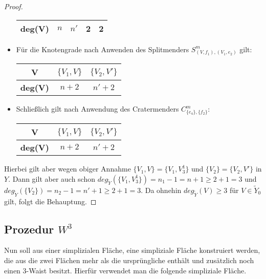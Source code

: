 \documentclass[12pt,titlepage]{article}
\begin{document}
\begin{proof}
\begin{itemize}
\begin{center}
\begin{tabular}{|c|c|c|c|c|}
  \hline
   \textbf{deg(V)} & $n$ & $n'$ & 2 & 2\\  
   \hline
 \end{tabular}
 \end{center}
\item Für die Knotengrade nach Anwenden des Splitmenders $S_{(V,f_1),(V_1,e_2)}^m$ gilt:
\begin{center}
\begin{tabular}{|c|c|c|}
\hline
 \textbf{V} & $\{V_1,V \}$ & $\{V_2,V'\}$ \\ 
  \hline
   \textbf{deg(V)} & $n+2$ & $n'+2$  \\  
   \hline
 \end{tabular}
 \end{center}
\item Schließlich gilt nach Anwendung des Cratermenders $C^m_{\{e_4\},\{f_2\}}$: 
\begin{center}
\begin{tabular}{|c|c|c|}
\hline
 \textbf{V} & $\{V_1,V \}$ & $\{V_2,V'\}$ \\ 
  \hline
   \textbf{deg(V)} & $n+2$ & $n'+2$  \\  
   \hline
 \end{tabular}
 \end{center}
\end{itemize}
Hierbei gilt aber wegen obiger Annahme $\{V_1,V\}=\{V_1,V_3^1\}$ und $\{V_2\}=\{V_2,V'\}$ in $Y$. Dann gilt aber auch schon $deg_{\tilde{Y}}(\{V_1,V_3^1\})=n_1-1=n+1\geq 2+1=3$ und $deg_{\tilde{Y}}(\{V_2\})=n_2-1=n'+1\geq 2+1=3$. Da ohnehin $deg_{\tilde{Y}}(V)\geq 3$ für $V\in \tilde{Y}_0$ gilt, folgt die Behauptung.

\end{proof}
\subsection{Prozedur $W^3$}
Nun soll aus einer simplizialen Fläche, eine simpliziale Fläche konstruiert werden, die aus die zwei Flächen mehr als die ursprüngliche enthält und zusätzlich noch einen 3-Waist besitzt. Hierfür verwendet man die folgende simpliziale Fläche.
\end{document}
